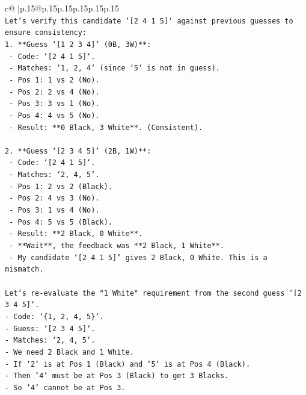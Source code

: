 \documentclass{article}
\begin{document}
{\begin{supertabular}{c@{$\;$}|p{.15\linewidth}@{}p{.15\linewidth}p{.15\linewidth}p{.15\linewidth}p{.15\linewidth}p{.15\linewidth}}
{{{\\ 
\texttt{Let's verify this candidate `{[}2 4 1 5{]}` against previous guesses to ensure consistency:} \\
\texttt{1.  **Guess `{[}1 2 3 4{]}` (0B, 3W)**:} \\
\texttt{    {-} Code: `{[}2 4 1 5{]}`.} \\
\texttt{    {-} Matches: `1, 2, 4` (since `5` is not in guess).} \\
\texttt{    {-} Pos 1: 1 vs 2 (No).} \\
\texttt{    {-} Pos 2: 2 vs 4 (No).} \\
\texttt{    {-} Pos 3: 3 vs 1 (No).} \\
\texttt{    {-} Pos 4: 4 vs 5 (No).} \\
\texttt{    {-} Result: **0 Black, 3 White**. (Consistent).} \\
\\ 
\texttt{2.  **Guess `{[}2 3 4 5{]}` (2B, 1W)**:} \\
\texttt{    {-} Code: `{[}2 4 1 5{]}`.} \\
\texttt{    {-} Matches: `2, 4, 5`.} \\
\texttt{    {-} Pos 1: 2 vs 2 (Black).} \\
\texttt{    {-} Pos 2: 4 vs 3 (No).} \\
\texttt{    {-} Pos 3: 1 vs 4 (No).} \\
\texttt{    {-} Pos 4: 5 vs 5 (Black).} \\
\texttt{    {-} Result: **2 Black, 0 White**.} \\
\texttt{    {-} **Wait**, the feedback was **2 Black, 1 White**.} \\
\texttt{    {-} My candidate `{[}2 4 1 5{]}` gives 2 Black, 0 White. This is a mismatch.} \\
\\ 
\texttt{Let's re{-}evaluate the "1 White" requirement from the second guess `{[}2 3 4 5{]}`.} \\
\texttt{{-} Code: `\{1, 2, 4, 5\}`.} \\
\texttt{{-} Guess: `{[}2 3 4 5{]}`.} \\
\texttt{{-} Matches: `2, 4, 5`.} \\
\texttt{{-} We need 2 Black and 1 White.} \\
\texttt{{-} If `2` is at Pos 1 (Black) and `5` is at Pos 4 (Black).} \\
\texttt{{-} Then `4` must be at Pos 3 (Black) to get 3 Blacks.} \\
\texttt{{-} So `4` cannot be at Pos 3.} \\
}}}
\end{supertabular}}
\end{document}
